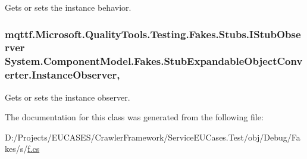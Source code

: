 Gets or sets the instance behavior.

\hypertarget{class_system_1_1_component_model_1_1_fakes_1_1_stub_expandable_object_converter_ab70e777907e30cf18d5dd6fe451444e8}{
\subsubsection[{Instance\-Observer}]{\setlength{\rightskip}{0pt plus 5cm}mqttf.\-Microsoft.\-Quality\-Tools.\-Testing.\-Fakes.\-Stubs.\-I\-Stub\-Observer System.\-Component\-Model.\-Fakes.\-Stub\-Expandable\-Object\-Converter.\-Instance\-Observer\hspace{0.3cm}{\ttfamily [get]}, {\ttfamily [set]}}}\label{class_system_1_1_component_model_1_1_fakes_1_1_stub_expandable_object_converter_ab70e777907e30cf18d5dd6fe451444e8}


Gets or sets the instance observer.



The documentation for this class was generated from the following file\-:\begin{DoxyCompactItemize}
\item 
D\-:/\-Projects/\-E\-U\-C\-A\-S\-E\-S/\-Crawler\-Framework/\-Service\-E\-U\-Cases.\-Test/obj/\-Debug/\-Fakes/s/\hyperlink{s_2f_8cs}{f.\-cs}\end{DoxyCompactItemize}
